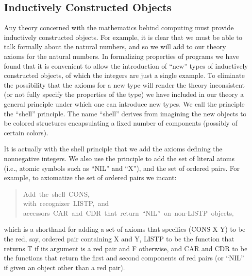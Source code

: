 \documentclass[11pt]{book}
\newenvironment{pubcrown}{\begin{quote}}{\end{quote}}
\newcommand{\pubdefaulttextsize}{\large}
\begin{document}
\subsection{Inductively Constructed Objects}
\pubdefaulttextsize
Any theory concerned with the mathematics behind computing must
provide inductively constructed objects.  For example, it is
clear that we must be able to talk formally about the
natural numbers, and so we will add to our theory axioms for the natural numbers.
In formalizing properties
of programs we have found that it is convenient to allow the introduction
of ``new''  types of inductively constructed objects, of which the integers
are just a single example.
To eliminate the possibility that the axioms
for a new type will render the theory inconsistent (or not fully
specify the properties of the type) we have included in our
theory a general principle under which one can introduce new types.
We call the principle the ``shell'' principle.  The name ``shell''
derives from imagining the new objects to be colored structures
encapsulating a fixed number of components (possibly of certain colors).

It is actually with the shell principle that we add the axioms defining
the nonnegative integers.  We also use the principle to add the set of
literal atoms (i.e., atomic symbols such as ``NIL'' and ``X''), and
the set of ordered pairs.
For example, to axiomatize the set of ordered pairs we incant:
\begin{pubcrown}
Add~the~shell~CONS,\\
with~recognizer~LISTP,~and\\
accessors~CAR~and~CDR~that~return~``NIL''~on~non-LISTP~objects,\\
\end{pubcrown}
which is a shorthand for adding a set of axioms that specifies (CONS X Y) to be
the red, say, ordered pair containing X and Y, LISTP to be the function that returns
T if its argument is a red pair and F otherwise, and CAR and CDR to be
the functions that return the first and second components of red
pairs (or ``NIL'' if given an object other than a red pair).
\end{document}
